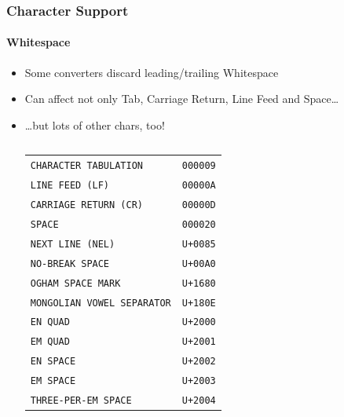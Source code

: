 \documentclass[
    alternativetitlepage=alternativ,
    cornerlogo=hgi_nds_logo2,
    sectionoverview,
]{rubpresentation}
\begin{document}
\begin{frame}
  \frametitle{Character Support}
  \framesubtitle{Whitespace}
  \begin{itemize}
    \item{} Some converters discard leading/trailing Whitespace
    \item{} Can affect not only Tab, Carriage Return, Line Feed and Space\dots{}
    \item{} \dots{}but lots of other chars, too!
    \begingroup
      \footnotesize
      \begin{columns}
        \begin{column}{0.5\textwidth}
          \begin{center}
            \begin{tabular}{lr}
              \texttt{CHARACTER TABULATION}               & \texttt{000009}\\
              \texttt{LINE FEED (LF)}                     & \texttt{00000A}\\
              \texttt{CARRIAGE RETURN (CR)}               & \texttt{00000D}\\
              \texttt{SPACE}                              & \texttt{000020}\\
              \texttt{NEXT LINE (NEL)}                    & \texttt{U+0085}\\
              \texttt{NO-BREAK SPACE}                     & \texttt{U+00A0}\\
              \texttt{OGHAM SPACE MARK}                   & \texttt{U+1680}\\
              \texttt{MONGOLIAN VOWEL SEPARATOR}          & \texttt{U+180E}\\
              \texttt{EN QUAD}                            & \texttt{U+2000}\\
              \texttt{EM QUAD}                            & \texttt{U+2001}\\
              \texttt{EN SPACE}                           & \texttt{U+2002}\\
              \texttt{EM SPACE}                           & \texttt{U+2003}\\
              \texttt{THREE-PER-EM SPACE}                 & \texttt{U+2004}\\
            \end{tabular}
          \end{center}
        \end{column}
        \begin{column}{0.5\textwidth}

\end{column}
\end{columns}
\end{itemize}
\end{frame}
\end{document}
